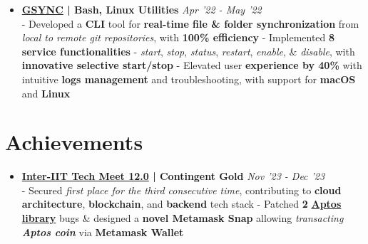 \documentclass[a4paper,10pt]{extarticle} %
\begin{document}
\begin{itemize}[leftmargin=0.55cm, rightmargin=0.2cm, label={\Large\textbullet}]
\item \textbf{\href{https://github.com/proffapt/gsync}{GSYNC} | Bash, Linux Utilities} \hfill{\textit{Apr '22 - May '22}} \\
- Developed a \textbf{CLI} tool for \textbf{real-time file \& folder synchronization} from \textit{local to remote git repositories}, with \textbf{100\% efficiency} \newline
- Implemented \textbf{8 service functionalities} - \textit{start}, \textit{stop}, \textit{status}, \textit{restart}, \textit{enable}, \& \textit{disable}, with \textbf{innovative selective start/stop} \newline
- Elevated user \textbf{experience by 40\%} with intuitive \textbf{logs management} and troubleshooting, with support for \textbf{macOS} and \textbf{Linux}

\end{itemize}


 \vspace{0.2cm}
\section{\textcolor{primary}{Achievements}}
 \vspace{0.1cm}

\begin{itemize}[leftmargin=0.55cm, rightmargin=0.2cm, label={\Large\textbullet}]


 \item \textbf{\href{https://interiit-tech.org/}{Inter-IIT Tech Meet 12.0} | Contingent Gold} \hfill{\textit{Nov '23 - Dec '23}} \\
- Secured \textit{first place for the third consecutive time}, contributing to \textbf{cloud architecture}, \textbf{blockchain}, and \textbf{backend} tech stack \newline
- Patched \textbf{2} \href{https://github.com/aptos-labs/aptos-core}{\textbf{Aptos library}} bugs \& designed a \textbf{novel Metamask Snap} allowing \textit{transacting \textbf{Aptos coin}} via \textbf{Metamask Wallet}

\end{itemize}


\vspace{0.2cm}
\end{document}
